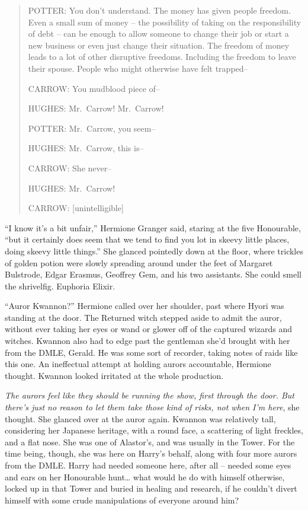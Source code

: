 \begin{quote}
{\capnums{}POTTER:} You don't understand. The money has given people
freedom. Even a small sum of money -- the possibility of taking on the
responsibility of debt -- can be enough to allow someone to change their
job or start a new business or even just change their situation. The
freedom of money leads to a lot of other disruptive freedoms. Including
the freedom to leave their spouse. People who might otherwise have felt
trapped--

{\capnums{}CARROW:} You mudblood piece of--

{\capnums{}HUGHES:} Mr.~Carrow! Mr.~Carrow!

{\capnums{}POTTER:} Mr.~Carrow, you seem--

{\capnums{}HUGHES:} Mr.~Carrow, this is--

{\capnums{}CARROW:} She never--

{\capnums{}HUGHES:} Mr.~Carrow!

{\capnums{}CARROW:} {[}unintelligible{]}
\end{quote}


\mybreak

``I know it's a bit unfair,'' Hermione Granger said, staring at the five
Honourable, ``but it certainly does seem that we tend to find you lot in
skeevy little places, doing skeevy little things.'' She glanced
pointedly down at the floor, where trickles of golden potion were slowly
spreading around under the feet of Margaret Bulstrode, Edgar Erasmus,
Geoffrey Gem, and his two assistants. She could smell the shrivelfig.
Euphoria Elixir.

``Auror Kwannon?'' Hermione called over her shoulder, past where Hyori
was standing at the door. The Returned witch stepped aside to admit the
auror, without ever taking her eyes or wand or glower off of the
captured wizards and witches. Kwannon also had to edge past the
gentleman she'd brought with her from the DMLE, Gerald. He was some sort
of recorder, taking notes of raids like this one. An ineffectual attempt
at holding aurors accountable, Hermione thought. Kwannon looked
irritated at the whole production.

\emph{The aurors feel like they should be running the show, first
through the door. But there's just no reason to let them take those kind
of risks, not when I'm here}, she thought. She glanced over at the auror
again. Kwannon was relatively tall, considering her Japanese heritage,
with a round face, a scattering of light freckles, and a flat nose. She
was one of Alastor's, and was usually in the Tower. For the time being,
though, she was here on Harry's behalf, along with four more aurors from
the DMLE. Harry had needed someone here, after all -- needed some eyes
and ears on her Honourable hunt\ldots{} what would he do with himself
otherwise, locked up in that Tower and buried in healing and research,
if he couldn't divert himself with some crude manipulations of everyone
around him?

